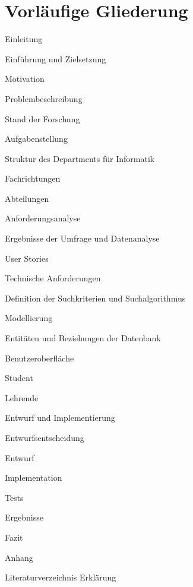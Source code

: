\section{Vorläufige Gliederung}

\begin{legal}[noitemsep]
\item Einleitung
	\begin{legal}
	\item Einführung und Zielsetzung
	\item Motivation
	\item Problembeschreibung
	\item Stand der Forschung
	\item Aufgabenstellung
	\end{legal}
\item Struktur des Departments für Informatik
	\begin{legal}
	\item Fachrichtungen
		\begin{legal}
		\item  Abteilungen
		\end{legal}
	\end{legal}
\item Anforderungsanalyse
	\begin{legal}
	\item Ergebnisse der Umfrage und Datenanalyse
	\item User Stories
	\item Technische Anforderungen
	\item Definition der Suchkriterien und Suchalgorithmus
	\item Modellierung
		\begin{legal}
		\item  Entitäten und Beziehungen der Datenbank
		\item  Benutzeroberfläche
			\begin{legal}
			\item  Student
			\item  Lehrende
			\end{legal}
		\end{legal}
	\end{legal}
\item Entwurf und Implementierung
	\begin{legal}
	\item Entwurfsentscheidung
	\item Entwurf
	\item Implementation
	\item Tests
	\item Ergebnisse
	\end{legal}
\item Fazit
\item Anhang
\item Literaturverzeichnis
Erklärung
\end{legal}